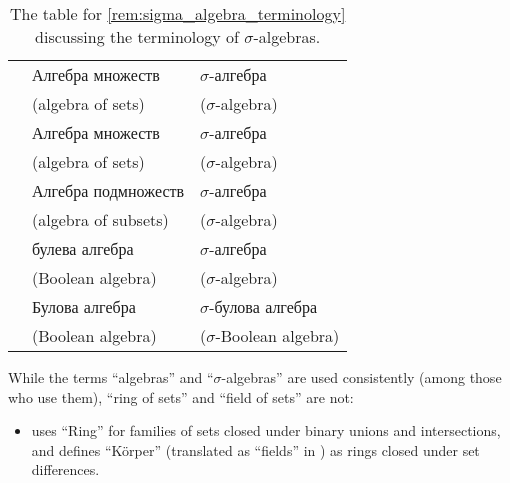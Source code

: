 \begin{remark}
\begin{table}[!ht]
\begin{tabular}{l l l}
      \cite[def. 2.1; def. 2.2]{Боровков1999ТеорияВероятностей}         & Алгебра множеств                                      & \( \sigma \)-алгебра                             \\
                                                                        & \footnotesize (algebra of sets)                       & \footnotesize (\( \sigma \)-algebra)             \\
      \cite[def. 1.2.1; def. 1.2.2]{Богачёв2003ОсновыТеорииМерыТом1}    & Алгебра множеств                                      & \( \sigma \)-алгебра                             \\
                                                                        & \footnotesize (algebra of sets)                       & \footnotesize (\( \sigma \)-algebra)             \\
      \cite[def. II.1.1; def. II.1.4]{Ширяев2007ВероятностьТом1}        & Алгебра подмножеств                                   & \( \sigma \)-алгебра                             \\
                                                                        & \footnotesize (algebra of subsets)                    & \footnotesize (\( \sigma \)-algebra)             \\
      \cite[def. 3.1; def. 3.3]{Драганов2022ТеорияНаМярката}            & булева алгебра                                        & \( \sigma \)-алгебра                             \\
                                                                        & \footnotesize (Boolean algebra)                       & \footnotesize (\( \sigma \)-algebra)     \\
      \cite[def. 1.1; def. 1.2]{ДимитровЯнев2007ВероятностиИСтатистика} & Булова алгебра                                        & \( \sigma \)-булова алгебра                      \\
                                                                        & \footnotesize (Boolean algebra)                       & \footnotesize (\( \sigma \)-Boolean algebra)     \\
      \bottomrule
    \end{tabular}
    \caption{The table for \cref{rem:sigma_algebra_terminology} discussing the terminology of \( \sigma \)-algebras.}\label{tab:rem:sigma_algebra_terminology}
  \end{table}

  While the terms \enquote{algebras} and \enquote{\( \sigma \)-algebras} are used consistently (among those who use them), \enquote{ring of sets} and \enquote{field of sets} are not:
  \begin{itemize}
    \item {} uses \enquote{Ring} for families of sets closed under binary unions and intersections, and defines \enquote{K\"{o}rper} (translated as \enquote{fields} in \cite[90]{Hausdorff1962SetTheory}) as rings closed under set differences.


\end{itemize}
\end{remark}
